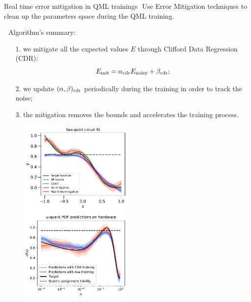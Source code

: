 \documentclass[8pt, xcolor={svgnames}, hyperref={linkcolor=black}]{beamer}
\begin{document}

\begin{frame}{Real time error mitigation in QML trainings}
\small
\faCrosshairs\,\,Use Error Mitigation techniques to clean up the parameters space 
during the QML training.

\faFlash\,\, Algorithm's summary:
\begin{itemize}[noitemsep]
\item[1.] we mitigate all the expected values $E$ through Clifford Data Regression (CDR):
\begin{equation}
E_{\rm mit} = \alpha_{\rm cdr} E_{\rm noisy} + \beta_{\rm cdr};
\end{equation}
\item[2.] we update $(\alpha, \beta)_{\rm cdr}$
periodically during the training in order to track the noise;
\item[3.] the mitigation removes the bounds and accelerates the training process.
\end{itemize}
\vspace{0.15cm}
\begin{figure}  
    \includegraphics[width=0.5\textwidth]{figures/2qfit.pdf}%
    \includegraphics[width=0.5\textwidth]{figures/hardware.pdf}
\end{figure}
\end{frame}
\end{document}
